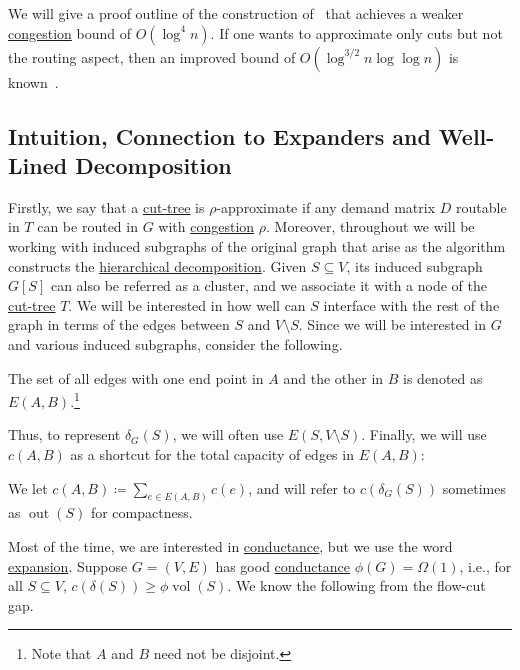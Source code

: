 We will give a proof outline of the construction of~\cite{bienkowski2003practical} that achieves a weaker \hyperref[def:congestion]{congestion} bound of \(O(\log ^4 n)\). If one wants to approximate only cuts but not the routing aspect, then an improved bound of \(O(\log ^{3 / 2} n \log \log n)\) is known~\cite{racke2014improved}.

\subsection{Intuition, Connection to Expanders and Well-Lined Decomposition}
Firstly, we say that a \hyperref[def:cut-tree]{cut-tree} is \(\rho \)-approximate if any demand matrix \(D\) routable in \(T\) can be routed in \(G\) with \hyperref[def:congestion]{congestion} \(\rho \). Moreover, throughout we will be working with induced subgraphs of the original graph that arise as the algorithm constructs the \hyperref[def:hierarchical-decomposition]{hierarchical decomposition}. Given \(S \subseteq V\), its induced subgraph \(G[S]\) can also be referred as a cluster, and we associate it with a node of the \hyperref[def:cut-tree]{cut-tree} \(T\). We will be interested in how well can \(S\) interface with the rest of the graph in terms of the edges between \(S\) and \(V\setminus S\). Since we will be interested in \(G\) and various induced subgraphs, consider the following.

\begin{notation}
	The set of all edges with one end point in \(A\) and the other in \(B\) is denoted as \(E(A, B)\).\footnote{Note that \(A\) and \(B\) need not be disjoint.}
\end{notation}

Thus, to represent \(\delta _G(S)\), we will often use \(E(S, V\setminus S)\). Finally, we will use \(c(A, B)\) as a shortcut for the total capacity of edges in \(E(A, B)\):

\begin{notation}
	We let \(c(A, B) \coloneqq \sum_{e \in E(A, B)} c(e)\), and will refer to \(c(\delta _G(S))\) sometimes as \(\operatorname{out}(S) \) for compactness.
\end{notation}

Most of the time, we are interested in \hyperref[def:conductance]{conductance}, but we use the word \hyperref[def:expansion]{expansion}. Suppose \(G = (V, E)\) has good \hyperref[def:conductance]{conductance} \(\phi (G) = \Omega (1)\), i.e., for all \(S \subseteq V\), \(c(\delta (S)) \geq \phi \operatorname{vol}(S) \). We know the following from the flow-cut gap.

